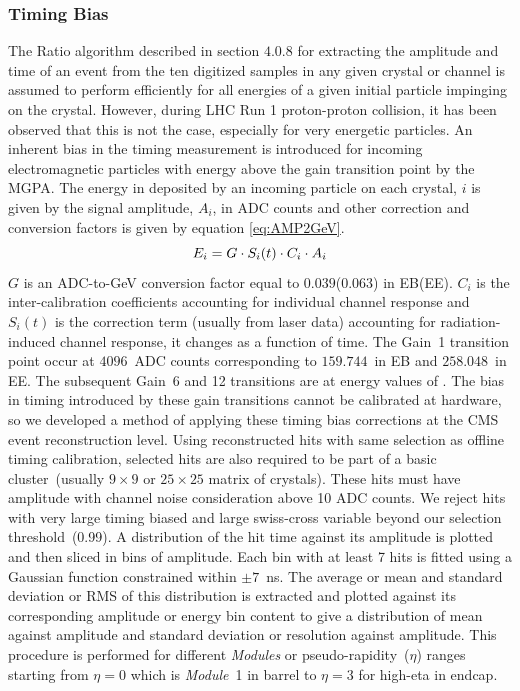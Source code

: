 \subsubsection{Timing Bias}
The  Ratio algorithm described in section $4.0.8$ for extracting the amplitude and time of an event from the ten digitized samples in any given crystal or channel is assumed to perform efficiently for all energies of a given initial particle impinging on the crystal. However, during LHC Run 1 proton-proton collision, it has been observed that this is not the case, especially for very energetic particles. An inherent bias in the timing measurement is introduced for incoming electromagnetic particles with energy above the gain transition point by the MGPA. The energy in \GeV  deposited by an incoming particle on each crystal, $i$ is given by the signal amplitude, $A_{i}$, in ADC counts and other correction and conversion factors is given by equation \ref{eq:AMP2GeV}.
\begin{equation}{\label{eq:AMP2GeV}}
    E_{i} =  G \cdot S_{i}(t) \cdot C_{i} \cdot A_{i} 
\end{equation}
$G$ is an ADC-to-GeV conversion factor equal to $0.039$($0.063$) in EB(EE). $C_{i}$ is the inter-calibration coefficients accounting for individual channel response and $S_{i}(t)$ is the correction term (usually from laser data) accounting for radiation-induced channel response,  it changes as a function of time. The Gain~1 transition point occur at $4096$~ADC counts corresponding to $159.744$~\GeV in EB and $258.048$~\GeV in EE. The subsequent Gain~6 and 12 transitions are at energy values of \TeV.
The bias in timing introduced by these gain transitions cannot be calibrated at hardware, so we developed a method of applying these timing bias corrections at the CMS event reconstruction level.
Using reconstructed hits with same selection as offline timing calibration, selected hits are also required to be part of a basic cluster~(usually $9\times 9 $ or $25\times 25$ matrix of crystals). These hits must have amplitude with channel noise consideration above 10 ADC counts. We reject hits with very large timing biased and large swiss-cross variable beyond our selection threshold~(0.99). A distribution of the hit time against its amplitude is plotted and then sliced in bins of amplitude. Each bin with at least 7 hits is fitted using a Gaussian function constrained within $\pm 7$~ns. The average or mean and standard deviation or RMS of this distribution is extracted and plotted against its corresponding amplitude or energy bin content to give a distribution of mean against amplitude and standard deviation or resolution against amplitude. This procedure is performed for different \textit{Modules} or pseudo-rapidity~($\eta$) ranges starting from $\eta = 0$ which is \textit{Module}~1 in barrel to $\eta = 3$ for high-eta in endcap.
